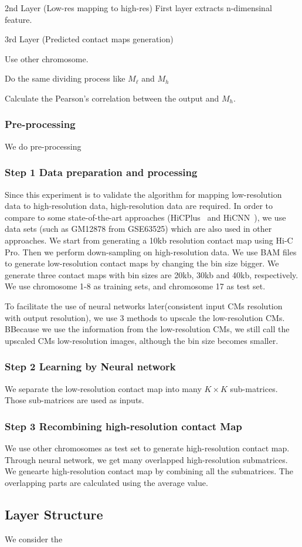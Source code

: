 \documentclass[a4paper,12pt]{article}
\begin{document}
2nd Layer (Low-res mapping to high-res)
First layer extracts n-dimensinal feature.


3rd Layer (Predicted contact maps generation)


Use other chromosome. 

Do the same dividing process like $M_\ell$ and $M_h$

Calculate the Pearson's correlation between the output and $M_h$.






\subsubsection*{Pre-processing}
We do pre-processing
\subsubsection*{Step 1 Data preparation and processing}
Since this experiment is to validate the algorithm for mapping low-resolution data to high-resolution data, 
high-resolution data are required. 
In order to compare to some state-of-the-art approaches (HiCPlus~\cite{Zhang2018} and HiCNN~\cite{Liu2019}), 
we use data sets (such as GM12878 from GSE63525) which are also used in other approaches. 
We start from generating a 10kb resolution contact map 
using Hi-C Pro. 
Then we perform down-sampling on high-resolution data. 
We use BAM files to generate low-resolution contact maps by changing the bin size bigger. 
We generate three contact maps with bin sizes are 20kb, 30kb and 40kb, respectively. 
We use chromosome 1-8 as training sets, and chromosome 17 as test set.


To facilitate the use of neural networks later(consistent input CMs resolution with output resolution), we use 3 methods to upscale the low-resolution CMs. BBecause we use the information from the low-resolution CMs, we still call the upscaled CMs low-resolution images, although the bin size becomes smaller.

\subsubsection*{Step 2 Learning by Neural network}
We separate the low-resolution contact map into many $K \times K$ sub-matrices. 
Those sub-matrices are used as inputs.


\subsubsection*{Step 3 Recombining high-resolution contact Map}
We use other chromosomes as test set to generate high-resolution contact map. Through neural network, we get many overlapped high-resolution submatrices. We genearte high-resolution contact map by combining all the submatrices. The overlapping parts are calculated using the average value.

\subsection{Layer Structure}
We consider the 






\end{document}
